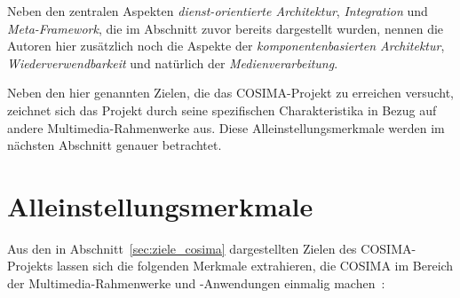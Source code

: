   Neben den zentralen Aspekten \emph{dienst-orientierte Architektur}, \emph{Integration} und \emph{Meta-Framework}, die im Abschnitt zuvor bereits dargestellt wurden, nennen die Autoren hier zusätzlich noch die Aspekte der \emph{komponentenbasierten Architektur}, \emph{Wiederverwendbarkeit} und natürlich der \emph{Medienverarbeitung}.
  
  Neben den hier genannten Zielen, die das COSIMA-Projekt zu erreichen versucht, zeichnet sich das Projekt durch seine spezifischen Charakteristika in Bezug auf andere Multimedia-Rahmenwerke aus. Diese Alleinstellungsmerkmale werden im nächsten Abschnitt genauer betrachtet.



\section{Alleinstellungsmerkmale} %
\label{sec:alleinstellungsmerkmale}

  Aus den in Abschnitt~\ref{sec:ziele_cosima} dargestellten Zielen des COSIMA-Projekts lassen sich die folgenden Merkmale extrahieren, die COSIMA im Bereich der Multimedia-Rahmenwerke und -Anwendungen einmalig machen~\citep[S. 3f]{bericht}:
  
